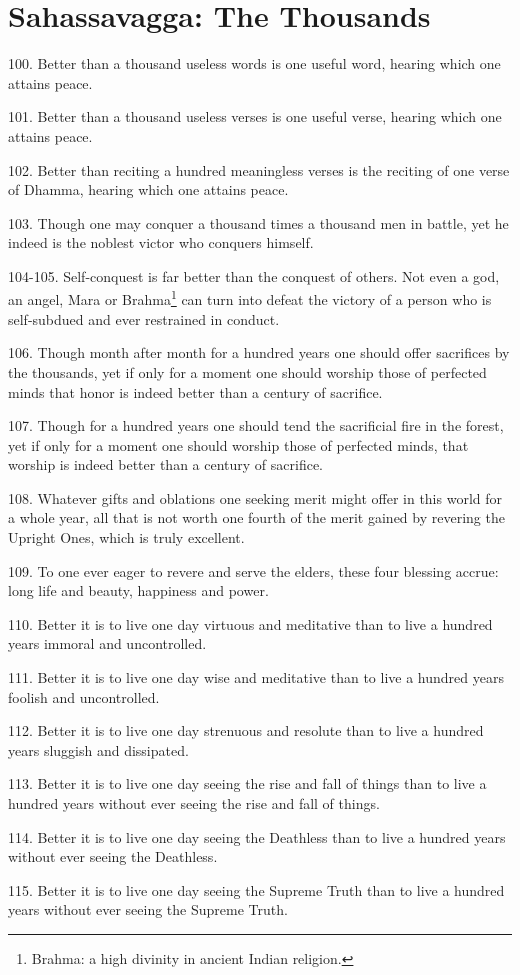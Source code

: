 \newpage
\chapter{Sahassavagga: The Thousands}

100. Better than a thousand useless words is one useful word, hearing which one attains peace.

101. Better than a thousand useless verses is one useful verse, hearing which one attains peace.

102. Better than reciting a hundred meaningless verses is the reciting of one verse of Dhamma, hearing which one attains peace.

103. Though one may conquer a thousand times a thousand men in battle, yet he indeed is the noblest victor who conquers himself.

104-105. Self-conquest is far better than the conquest of others. Not even a god, an angel, Mara or Brahma\footnote{Brahma: a high divinity in ancient Indian religion.} can turn into defeat the victory of a person who is self-subdued and ever restrained in conduct.

106. Though month after month for a hundred years one should offer sacrifices by the thousands, yet if only for a moment one should worship those of perfected minds that honor is indeed better than a century of sacrifice.

107. Though for a hundred years one should tend the sacrificial fire in the forest, yet if only for a moment one should worship those of perfected minds, that worship is indeed better than a century of sacrifice.

108. Whatever gifts and oblations one seeking merit might offer in this world for a whole year, all that is not worth one fourth of the merit gained by revering the Upright Ones, which is truly excellent.

109. To one ever eager to revere and serve the elders, these four blessing accrue: long life and beauty, happiness and power.

110. Better it is to live one day virtuous and meditative than to live a hundred years immoral and uncontrolled.

111. Better it is to live one day wise and meditative than to live a hundred years foolish and uncontrolled.

112. Better it is to live one day strenuous and resolute than to live a hundred years sluggish and dissipated.

113. Better it is to live one day seeing the rise and fall of things than to live a hundred years without ever seeing the rise and fall of things.

114. Better it is to live one day seeing the Deathless than to live a hundred years without ever seeing the Deathless.

115. Better it is to live one day seeing the Supreme Truth than to live a hundred years without ever seeing the Supreme Truth.
